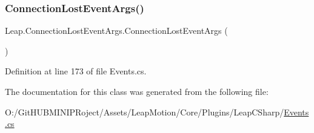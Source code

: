 \subsubsection{\texorpdfstring{ConnectionLostEventArgs()}{ConnectionLostEventArgs()}}
{\footnotesize\ttfamily Leap.\+Connection\+Lost\+Event\+Args.\+Connection\+Lost\+Event\+Args (\begin{DoxyParamCaption}{ }\end{DoxyParamCaption})}



Definition at line 173 of file Events.\+cs.



The documentation for this class was generated from the following file\+:\begin{DoxyCompactItemize}
\item 
O\+:/\+Git\+H\+U\+B\+M\+I\+N\+I\+P\+Roject/\+Assets/\+Leap\+Motion/\+Core/\+Plugins/\+Leap\+C\+Sharp/\mbox{\hyperlink{_events_8cs}{Events.\+cs}}\end{DoxyCompactItemize}
